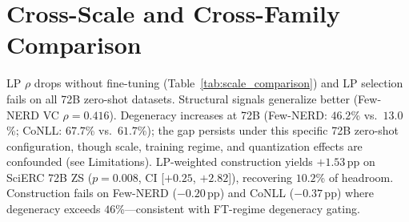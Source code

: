 \section{Cross-Scale and Cross-Family Comparison}\label{app:cross_scale}

\begin{table}[t]
\centering
\small
\caption{Cross-scale and cross-family comparison ($N{=}8$, $T{=}1.0$). Hdr.\ = oracle $-$ greedy (pp). Degen.: instance degeneracy (\%). F1 values are entity-type-averaged macro-F1, which differs from the instance-averaged F1 in Table~\ref{tab:fewnerd}. $^\star$Qwen2.5; unmarked: Qwen3. $^\dagger$Not computed. $^\ddagger$200-instance subset; 10.1\% parse failures excluded.}
\label{tab:scale_comparison}
\end{table}

LP $\rho$ drops without fine-tuning (Table~\ref{tab:scale_comparison}) and LP selection fails on all 72B zero-shot datasets. Structural signals generalize better (Few-NERD VC $\rho{=}0.416$). Degeneracy increases at 72B (Few-NERD: $46.2$\% vs.\ $13.0$\%; CoNLL: $67.7$\% vs.\ $61.7$\%); the gap persists under this specific 72B zero-shot configuration, though scale, training regime, and quantization effects are confounded (see Limitations).
LP-weighted construction yields $+1.53$\,pp on SciERC 72B ZS ($p{=}0.008$, CI [$+0.25$, $+2.82$]), recovering $10.2$\% of headroom. Construction fails on Few-NERD ($-0.20$\,pp) and CoNLL ($-0.37$\,pp) where degeneracy exceeds $46$\%---consistent with FT-regime degeneracy gating.


